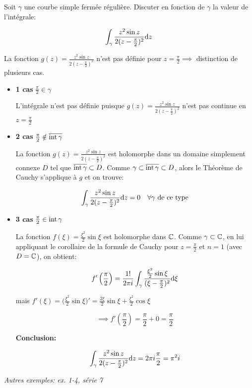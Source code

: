 \begin{example}[2]
    Soit $\gamma$ une courbe simple fermée régulière.
    Discuter en fonction de $\gamma$ la valeur de l'intégrale:
    
    \[\int_\gamma \frac{z^2 \sin z}{2 (z - \frac{\pi}{2})^2} \mathrm{d}z\]
    
    La fonction $g(z) = \frac{z^2 \sin z}{2 (z - \frac{\pi}{2})^2}$ n'est pas définie pour $z = \frac{\pi}{2} \implies$ distinction de plusieurs cas.
    
    \begin{itemize}
        \item \textbf{1\ier{} cas} $\frac{\pi}{2} \in \gamma$
        
        L'intégrale n'est pas définie puisque $g(z) = \frac{z^2 \sin z}{2 (z - \frac{\pi}{2})^2}$ n'est pas continue en $z = \frac{\pi}{2}$
        
        \item \textbf{2\ieme{} cas} $\frac{\pi}{2} \notin \overline{\textrm{int}\, \gamma}$
        
        La fonction $g(z) = \frac{z^2 \sin z}{2 (z - \frac{\pi}{2})^2}$ est holomorphe dans un domaine simplement connexe $D$ tel que $\overline{\textrm{int}\, \gamma} \subset D$. Comme $\gamma \subset \overline{\textrm{int}\, \gamma} \subset D$, alors le Théorème de Cauchy s'applique à $g$ et on trouve:
        
        \[ \int_\gamma \frac{z^2 \sin z}{2 (z - \frac{\pi}{2})^2} \mathrm{d}z = 0 \quad \forall \gamma \textrm{ de ce type} \]
        
        \item \textbf{3\ieme{} cas} $\frac{\pi}{2} \in \textrm{int}\,\gamma$
        
        La fonction $f(\xi) = \frac{\xi^2}{2} \sin \xi$ est holomorphe dans $\mathbb{C}$. Comme $\gamma \subset \mathbb{C}$, en lui appliquant le corollaire de la formule de Cauchy pour $z = \frac{\pi}{2}$ et $n = 1$ (avec $D = \mathbb{C}$), on obtient:
        
        \[
        f'\left(\frac{\pi}{2}\right) = \frac{1!}{2\pi i} \int_\gamma \frac{\frac{\xi^2}{2} \sin \xi}{(\xi - \frac{\pi}{2})^2} \mathrm{d}\xi
        \]
        
        mais $f'(\xi) = \big(\frac{\xi^2}{2} \sin \xi\big)' = \frac{2\xi}{2} \sin \xi + \frac{\xi^2}{2} \cos \xi$
        
        \[ \implies f'\left(\frac{\pi}{2}\right) = \frac{\pi}{2} + 0 = \frac{\pi}{2} \]
        
        \textbf{Conclusion:}
        
        \[
        \int_\gamma \frac{z^2 \sin z}{2(z - \frac{\pi}{2})^2} \mathrm{d}z = 2\pi i \frac{\pi}{2} = \pi^2 i
        \]
    \end{itemize}
\end{example}

\textit{Autres exemples: ex. 1-4, série 7}
